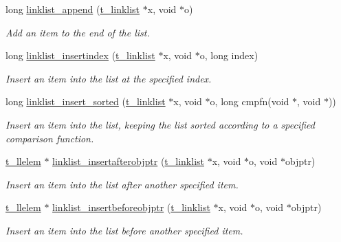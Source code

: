 \begin{DoxyCompactItemize}
long \hyperlink{group__linklist_ga7360ba45714cb28e2b4cd44aa8998a67}{linklist\_\-append} (\hyperlink{structt__linklist}{t\_\-linklist} $\ast$x, void $\ast$o)
\begin{DoxyCompactList}\small\item\em Add an item to the end of the list. \item\end{DoxyCompactList}\item 
long \hyperlink{group__linklist_gac652f2501c274abd1d8fe53626153bde}{linklist\_\-insertindex} (\hyperlink{structt__linklist}{t\_\-linklist} $\ast$x, void $\ast$o, long index)
\begin{DoxyCompactList}\small\item\em Insert an item into the list at the specified index. \item\end{DoxyCompactList}\item 
long \hyperlink{group__linklist_gadac3bedb5a07ebf8f1b4751cc73a2c52}{linklist\_\-insert\_\-sorted} (\hyperlink{structt__linklist}{t\_\-linklist} $\ast$x, void $\ast$o, long cmpfn(void $\ast$, void $\ast$))
\begin{DoxyCompactList}\small\item\em Insert an item into the list, keeping the list sorted according to a specified comparison function. \item\end{DoxyCompactList}\item 
\hyperlink{structt__llelem}{t\_\-llelem} $\ast$ \hyperlink{group__linklist_gafd9471b4a798cd55d9d5bc79000b5a93}{linklist\_\-insertafterobjptr} (\hyperlink{structt__linklist}{t\_\-linklist} $\ast$x, void $\ast$o, void $\ast$objptr)
\begin{DoxyCompactList}\small\item\em Insert an item into the list after another specified item. \item\end{DoxyCompactList}\item 
\hyperlink{structt__llelem}{t\_\-llelem} $\ast$ \hyperlink{group__linklist_gaaa759a9962d69633c45efac04382fb61}{linklist\_\-insertbeforeobjptr} (\hyperlink{structt__linklist}{t\_\-linklist} $\ast$x, void $\ast$o, void $\ast$objptr)
\begin{DoxyCompactList}\small\item\em Insert an item into the list before another specified item. \item\end{DoxyCompactList}\item 

\end{DoxyCompactItemize}
